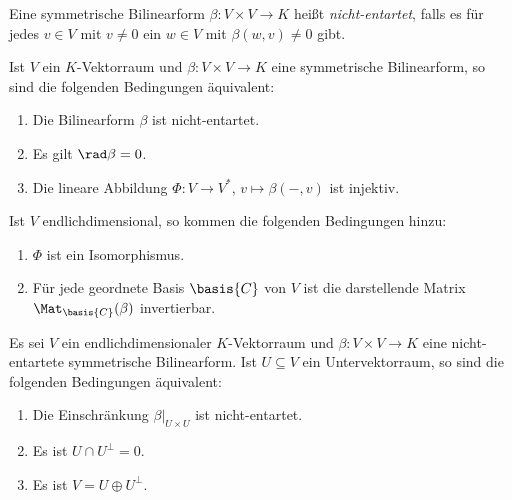 \begin{definition}
  Eine symmetrische Bilinearform $\beta \colon V \times V \to K$ heißt \emph{nicht-entartet}, falls es für jedes $v \in V$ mit $v \neq 0$ ein $w \in V$ mit $\beta(w,v) \neq 0$ gibt.
\end{definition}


\begin{proposition}
  Ist $V$ ein $K$-Vektorraum und $\beta \colon V \times V \to K$ eine symmetrische Bilinearform, so sind die folgenden Bedingungen äquivalent:
  \begin{enumerate}[leftmargin=*, label=\roman*)]
    \item
      Die Bilinearform $\beta$ ist nicht-entartet.
    \item
      Es gilt $\rad \beta = 0$.
    \item
      Die lineare Abbildung $\Phi \colon V \to V^*$, $v \mapsto \beta(-,v)$ ist injektiv.
  \end{enumerate}
  Ist $V$ endlichdimensional, so kommen die folgenden Bedingungen hinzu:
  \begin{enumerate}[leftmargin=*, label=\roman*), resume]
    \item
      $\Phi$ ist ein Isomorphismus.
    \item
      Für jede geordnete Basis $\basis{C}$ von $V$ ist die darstellende Matrix $\Mat_\basis{C}(\beta)$ invertierbar.
  \end{enumerate}
\end{proposition}


\begin{proposition}
  Es sei $V$ ein endlichdimensionaler $K$-Vektorraum und $\beta \colon V \times V \to K$ eine nicht-entartete symmetrische Bilinearform.
  Ist $U \subseteq V$ ein Untervektorraum, so sind die folgenden Bedingungen äquivalent:
  \begin{enumerate}[leftmargin=*, label=\roman*)]
    \item
      Die Einschränkung $\beta|_{U \times U}$ ist nicht-entartet.
    \item
      Es ist $U \cap U^\perp = 0$.
    \item
      Es ist $V = U \oplus U^\perp$.
  \end{enumerate}
\end{proposition}












